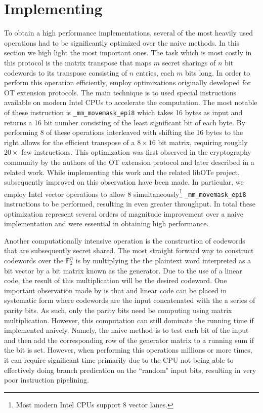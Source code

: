 \section{Implementing}

To obtain a high performance implementations, several of the most heavily used operations had to be significantly optimized over the naive methods. In this section we high light the most important ones. The task which is most costly in this protocol is the matrix transpose that maps $m$ secret sharings of $n$ bit codewords to its transpose consisting of $n$ entries, each $m$ bits long. In order to perform this operation efficiently, employ optimizations originally developed for OT extension protocols. The main technique is to used special instructions available on modern Intel CPUs to accelerate the computation. The most notable of these instruction is \texttt{\_mm\_movemask\_epi8} which takes 16 bytes as input and returns a 16 bit number consisting of the least significant bit of each byte. By performing 8 of these operations interleaved with shifting the 16 bytes to the right allows for the efficient transpose of a $8\times 16$ bit matrix, requiring roughly $20\times$ few instructions. This optimization was first observed in the cryptography community by the authors of the OT extension protocol\cite{KOS} and later described in a related work\cite{mascot}. While implementing this work and the related libOTe\cite{libOTe} project, subsequently improved on this observation have been made. In particular, we employ Intel vector operations to allow 8  simultaneously\footnote{Most modern Intel CPUs support 8 vector lanes.} \texttt{\_mm\_movemask\_epi8} instructions to be performed, resulting in even greater throughput. In total these optimization represent several orders of magnitude improvement over a naive implementation and were essential in obtaining high performance.


Another computationally intensive operation is the construction of codewords that are subsequently secret shared. The most straight forward way to construct codewords over the $\mathbb{F}_2^n$ is by multiplying the the plaintext word interpreted as a bit vector by a bit matrix known as the generator. Due to the use of a linear code, the result of this multiplication will be the desired codeword. One important observation made by \cite{DBLP:conf/tcc/FrederiksenJNT16} is that and linear code can be placed in systematic form where codewords are the input concatenated with the a series of parity bits. As such, only the parity bits need be computing using matrix multiplication. However, this computation can still dominate the running time if implemented naively. Namely, the naive method is to test each bit of the input and then add the corresponding row of the generator matrix to a running sum if the bit is set. However, when performing this operations millions or more times, it can require significant time primarily due to the CPU not being able to effectively doing branch predication on the ``random" input bits, resulting in very poor instruction pipelining. 

